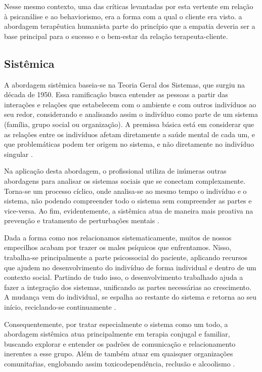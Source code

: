 Nesse mesmo contexto, uma das críticas levantadas por esta vertente em relação à psicanálise e ao behaviorismo, era a forma com a qual o cliente era visto. a abordagem terapêutica humanista parte do princípio que a empatia deveria ser a base principal para o sucesso e o bem-estar da relação terapeuta-cliente.

\subsection{Sistêmica}
\label{sec:sistemica}
A abordagem sistêmica baseia-se na Teoria Geral dos Sistemas, que surgiu na década de 1950. Essa ramificação busca entender as pessoas a partir das interações e relações que estabelecem com o ambiente e com outros indivíduos ao seu redor, considerando e analisando assim o indivíduo como parte de um sistema (família, grupo social ou organização). A premissa básica está em considerar que as relações entre os indivíduos afetam diretamente a saúde mental de cada um, e que problemáticas podem ter origem no sistema, e não diretamente no indivíduo singular \cite{Verissimo2020}.

Na aplicação desta abordagem, o profissional utiliza de inúmeras outras abordagens para analisar os sistemas sociais que se conectam complexamente. Torna-se um processo cíclico, onde analisa-se ao mesmo tempo o indivíduo e o sistema, não podendo compreender todo o sistema sem compreender as partes e vice-versa. Ao fim, evidentemente, a sistêmica atua de maneira mais proativa na prevenção e tratamento de perturbações mentais \cite{Verissimo2020}. 

Dada a forma como nos relacionamos sistematicamente, muitos de nossos empecilhos acabam por trazer os males psíquicos que enfrentamos. Nisso, trabalha-se principalmente a parte psicossocial do paciente, aplicando recursos que ajudem no desenvolvimento do indivíduo de forma individual e dentro de um contexto social. Partindo de tudo isso, o desenvolvimento trabalhado ajuda a fazer a integração dos sistemas, unificando as partes necessárias ao crescimento. A mudança vem do individual, se espalha ao restante do sistema e retorna ao seu início, reciclando-se continuamente \cite{Verissimo2020}.

Consequentemente, por tratar especialmente o sistema como um todo, a abordagem sistêmica atua principalmente em terapia conjugal e familiar, buscando explorar e entender os padrões de comunicação e relacionamento inerentes a esse grupo. Além de também atuar em quaisquer organizações comunitaŕias, englobando assim toxicodependência, reclusão e alcoolismo \cite{Verissimo2020}.

